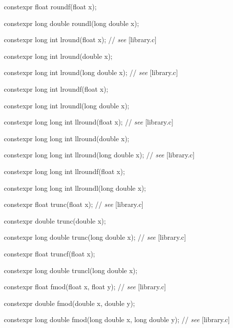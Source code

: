 \documentclass[prd,twocolumn,amsmath,amssymb,nofootinbib,eqsecnum]{revtex4-1}
\newcommand{\oldhighlight}[1]{#1}
\newcommand{\stdcomment}[1]{{// {\it see} [#1]}}
\begin{document}
{\oldhighlight{constexpr} float roundf(float x);

\oldhighlight{constexpr} long double roundl(long double x);

\vspace{2ex}


\oldhighlight{constexpr} long int lround(float x); \stdcomment{library.c}

\oldhighlight{constexpr} long int lround(double x);

\oldhighlight{constexpr} long int lround(long double x); \stdcomment{library.c}

\oldhighlight{constexpr} long int lroundf(float x);

\oldhighlight{constexpr} long int lroundl(long double x);

\vspace{2ex}


\oldhighlight{constexpr} long long int llround(float x); \stdcomment{library.c}

\oldhighlight{constexpr} long long int llround(double x);

\oldhighlight{constexpr} long long int llround(long double x); \stdcomment{library.c}

\oldhighlight{constexpr} long long int llroundf(float x);

\oldhighlight{constexpr} long long int llroundl(long double x);

\vspace{2ex}


\oldhighlight{constexpr} float trunc(float x); \stdcomment{library.c}

\oldhighlight{constexpr} double trunc(double x);

\oldhighlight{constexpr} long double trunc(long double x); \stdcomment{library.c}

\oldhighlight{constexpr} float truncf(float x);

\oldhighlight{constexpr} long double truncl(long double x);

\vspace{2ex}


\oldhighlight{constexpr} float fmod(float x, float y); \stdcomment{library.c}

\oldhighlight{constexpr} double fmod(double x, double y);

\oldhighlight{constexpr} long double fmod(long double x, long double y); \stdcomment{library.c}

}
\end{document}
